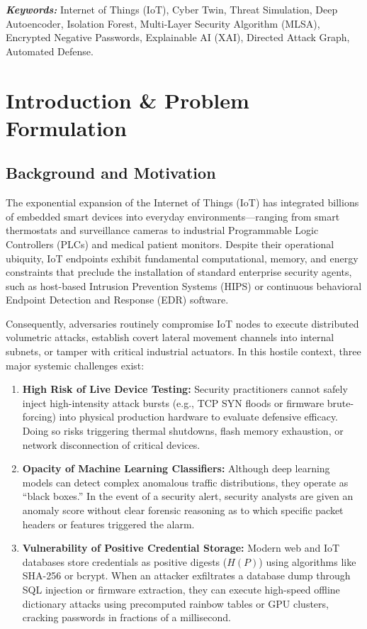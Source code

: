\documentclass[12pt,a4paper]{report}
\begin{document}
\textbf{\textit{Keywords:}} Internet of Things (IoT), Cyber Twin, Threat Simulation, Deep Autoencoder, Isolation Forest, Multi-Layer Security Algorithm (MLSA), Encrypted Negative Passwords, Explainable AI (XAI), Directed Attack Graph, Automated Defense.

\newpage
\tableofcontents
\newpage

\chapter{Introduction \& Problem Formulation}

\section{Background and Motivation}
The exponential expansion of the Internet of Things (IoT) has integrated billions of embedded smart devices into everyday environments—ranging from smart thermostats and surveillance cameras to industrial Programmable Logic Controllers (PLCs) and medical patient monitors. Despite their operational ubiquity, IoT endpoints exhibit fundamental computational, memory, and energy constraints that preclude the installation of standard enterprise security agents, such as host-based Intrusion Prevention Systems (HIPS) or continuous behavioral Endpoint Detection and Response (EDR) software.

Consequently, adversaries routinely compromise IoT nodes to execute distributed volumetric attacks, establish covert lateral movement channels into internal subnets, or tamper with critical industrial actuators. In this hostile context, three major systemic challenges exist:

\begin{enumerate}
    \item \textbf{High Risk of Live Device Testing:} Security practitioners cannot safely inject high-intensity attack bursts (e.g., TCP SYN floods or firmware brute-forcing) into physical production hardware to evaluate defensive efficacy. Doing so risks triggering thermal shutdowns, flash memory exhaustion, or network disconnection of critical devices.
    \item \textbf{Opacity of Machine Learning Classifiers:} Although deep learning models can detect complex anomalous traffic distributions, they operate as ``black boxes.'' In the event of a security alert, security analysts are given an anomaly score without clear forensic reasoning as to which specific packet headers or features triggered the alarm.
    \item \textbf{Vulnerability of Positive Credential Storage:} Modern web and IoT databases store credentials as positive digests ($H(P)$) using algorithms like SHA-256 or bcrypt. When an attacker exfiltrates a database dump through SQL injection or firmware extraction, they can execute high-speed offline dictionary attacks using precomputed rainbow tables or GPU clusters, cracking passwords in fractions of a millisecond.
\end{enumerate}
\end{document}
